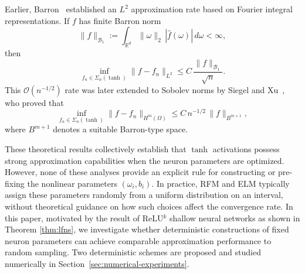\documentclass{article}
\theoremstyle{remark}
\begin{document}
\medskip
\noindent
Earlier, Barron~\cite{Barron:1993} established an $L^2$ approximation rate
based on Fourier integral representations.
If $f$ has finite Barron norm
\[
\|f\|_{\mathcal{B}_1}
:= \int_{\mathbb{R}^d} \|\omega\|_2\, |\hat{f}(\omega)|\, d\omega < \infty,
\]
then
\begin{equation}
\label{eq:barron_rate}
\inf_{f_n \in \Sigma_n(\tanh)} 
\|f - f_n\|_{L^2}
\leq
C\, \frac{\|f\|_{\mathcal{B}_1}}{\sqrt{n}}.
\end{equation}
This $\mathcal{O}(n^{-1/2})$ rate was later extended to Sobolev norms 
by Siegel and Xu~\cite{siegel2020approximation}, who proved that
\begin{equation}
\label{eq:siegelxu_rate}
\inf_{f_n \in \Sigma_n(\tanh)} 
\|f - f_n\|_{H^m(\Omega)} 
\leq
C\, n^{-1/2}\, \|f\|_{B^{m+1}},
\end{equation}
where $B^{m+1}$ denotes a suitable Barron-type space.

\medskip
\noindent
These theoretical results collectively establish that $\tanh$ activations possess 
strong approximation capabilities when the neuron parameters are optimized.
However, none of these analyses provide an explicit rule for constructing or pre-fixing the nonlinear parameters $(\omega_i,b_i)$.
In practice, RFM and ELM typically assign these parameters randomly from a uniform distribution on an interval, without theoretical guidance on how such choices affect the convergence rate.
In this paper, motivated by the result of ReLU$^k$ shallow neural networks as shown in Theorem \ref{thm:lfns}, we investigate whether deterministic constructions 
of fixed neuron parameters can achieve comparable approximation performance to random sampling.
Two deterministic schemes are proposed and studied numerically in 
Section~\ref{sec:numerical-experiments}.
\end{document}
